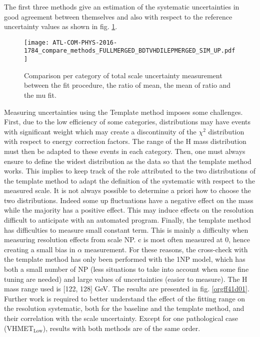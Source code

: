 \begin{enumerate}
\begin{enumerate}
The first three methods give an estimation of the systematic uncertainties in good agreement between themselves and also with respect to the reference uncertainty values as shown in fig. \ref{fig:org41d73b3}.

\begin{figure}[htbp]
\centering
\texttt{[image: ATL-COM-PHYS-2016-1784\_compare\_methods\_FULLMERGED\_BDTVHDILEPMERGED\_SIM\_UP.pdf]}
\caption{\label{fig:org41d73b3}
Comparison per category of total scale uncertainty measurement between the fit procedure, the ratio of mean, the mean of ratio and the mu fit.}
\end{figure}

Measuring uncertainties using the Template method imposes some challenges.
First, due to the low efficiency of some categories, distributions may have events with significant weight which may create a discontinuity of the \(\chi^{\text{2}}\) distribution with respect to energy correction factors.
The range of the H mass distribution must then be adapted to these events in each category.
Then, one must always ensure to define the widest distribution as the data so that the template method works.
This implies to keep track of the role attributed to the two distributions of the template method to adapt the definition of the systematic with respect to the measured scale.
It is not always possible to determine a priori how to choose the two distributions.
Indeed some up fluctuations have a negative effect on the mass while the majority has a positive effect.
This may induce effects on the resolution difficult to anticipate with an automated program.
Finally, the template method has difficulties to measure small constant term.
This is mainly a difficulty when measuring resolution effects from scale NP.
c is most often measured at 0, hence creating a small bias in $\alpha$ measurement.
For these reasons, the cross-check with the template method has only been performed with the 1NP model, which has both a small number of NP (less situations to take into account when some fine tuning are needed) and large values of uncertainties (easier to measure).
The H mass range used is [122, 128] GeV.
The results are presented in fig. \ref{orgff41d01}.
Further work is required to better understand the effect of the fitting range on the resolution systematic, both for the baseline and the template method, and their correlation with the scale uncertainty.
Except for one pathological case (VHMET\(_{\text{Low}}\)), results with both methods are of the same order.


\end{enumerate}
\end{enumerate}
